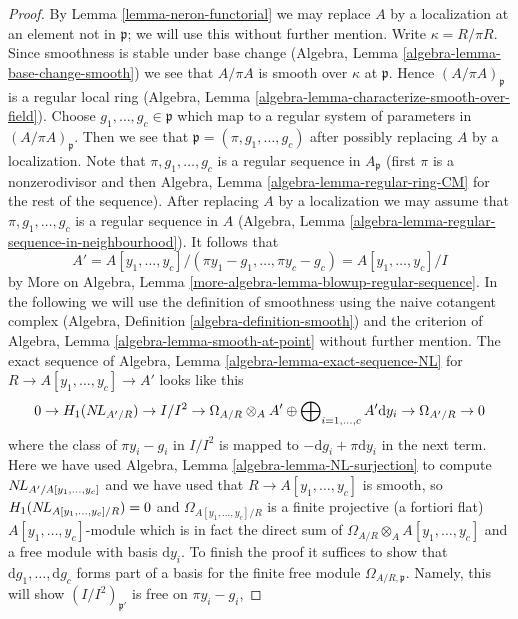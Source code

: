 \begin{proof}
By Lemma \ref{lemma-neron-functorial} we may replace $A$ by a localization
at an element not in $\mathfrak p$; we will use this without further mention.
Write $\kappa = R/\pi R$. Since smoothness is stable under base change
(Algebra, Lemma \ref{algebra-lemma-base-change-smooth})
we see that $A/\pi A$ is smooth over $\kappa$ at $\mathfrak p$.
Hence $(A/\pi A)_\mathfrak p$ is a regular local ring
(Algebra, Lemma \ref{algebra-lemma-characterize-smooth-over-field}).
Choose $g_1, \ldots, g_c \in \mathfrak p$ which map to
a regular system of parameters in $(A/\pi A)_\mathfrak p$.
Then we see that $\mathfrak p = (\pi, g_1, \ldots, g_c)$
after possibly replacing $A$ by a localization.
Note that $\pi, g_1, \ldots, g_c$ is a regular sequence
in $A_\mathfrak p$ (first $\pi$ is a nonzerodivisor and
then Algebra, Lemma \ref{algebra-lemma-regular-ring-CM}
for the rest of the sequence).
After replacing $A$ by a localization we may assume that
$\pi, g_1, \ldots, g_c$ is a regular sequence in $A$
(Algebra, Lemma \ref{algebra-lemma-regular-sequence-in-neighbourhood}).
It follows that
$$
A' = A[y_1, \ldots, y_c]/(\pi y_1 - g_1, \ldots, \pi y_c - g_c) =
A[y_1, \ldots, y_c]/I
$$
by More on Algebra, Lemma \ref{more-algebra-lemma-blowup-regular-sequence}.
In the following we will use the definition of smoothness using the
naive cotangent complex (Algebra, Definition \ref{algebra-definition-smooth})
and the criterion of Algebra, Lemma \ref{algebra-lemma-smooth-at-point}
without further mention.
The exact sequence of Algebra, Lemma \ref{algebra-lemma-exact-sequence-NL}
for $R \to A[y_1, \ldots, y_c] \to A'$ looks like this
$$
0 \to H_1(\mathop{N\!L}\nolimits_{A'/R}) \to I/I^2 \to
\Omega_{A/R} \otimes_A A' \oplus
\bigoplus\nolimits_{i = 1, \ldots, c} A' \text{d}y_i \to
\Omega_{A'/R} \to 0
$$
where the class of $\pi y_i - g_i$ in $I/I^2$ is mapped
to $- \text{d}g_i + \pi \text{d}y_i$ in the next term.
Here we have used Algebra, Lemma \ref{algebra-lemma-NL-surjection}
to compute $\mathop{N\!L}\nolimits_{A'/A[y_1, \ldots, y_c]}$ and we have used that
$R \to A[y_1, \ldots, y_c]$ is smooth, so
$H_1(\mathop{N\!L}\nolimits_{A[y_1, \ldots, y_c]/R}) = 0$ and
$\Omega_{A[y_1, \ldots, y_c]/R}$ is a finite projective (a fortiori flat)
$A[y_1, \ldots, y_c]$-module which is in fact the direct sum
of $\Omega_{A/R} \otimes_A A[y_1, \ldots, y_c]$ and a free
module with basis $\text{d}y_i$. To finish the proof it
suffices to show that $\text{d}g_1, \ldots, \text{d}g_c$
forms part of a basis for the finite free module $\Omega_{A/R, \mathfrak p}$.
Namely, this will show $(I/I^2)_{\mathfrak p'}$ is free on $\pi y_i - g_i$,

\end{proof}
